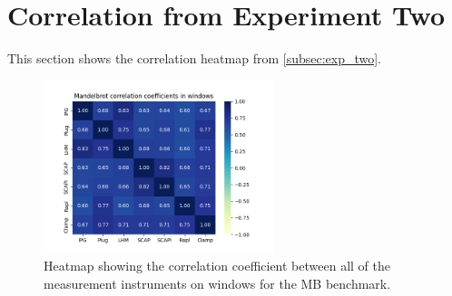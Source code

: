 \section*{Correlation from Experiment Two}\label{app:cor_exp_two}

This section shows the correlation heatmap from \cref{subsec:exp_two}.

\begin{figure}[H]
    \centering
    \hspace*{-1cm} %
    \includegraphics[width=0.6\textwidth]{figures/Mandelbrot_ex2.png}
    \caption{Heatmap showing the correlation coefficient between all of the measurement instruments on windows for the MB benchmark.}
    \label{fig:mandelbrotCorr}
\end{figure}